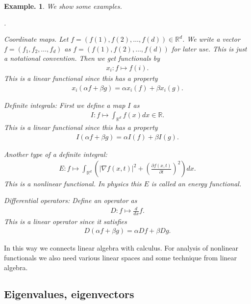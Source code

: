 \documentclass[openany, a4paper, oneside]{book}
\newcounter{enum2}
\renewenvironment{enumerate}{%
\begin{list}%
{%
\arabic{enum2}.\ \,%
}%
{%
\usecounter{enum2}
\setlength{\itemindent}{0pt}%
\setlength{\leftmargin}{6pt}%
\setlength{\rightmargin}{0pt}%
\setlength{\labelsep}{0pt}%
\setlength{\labelwidth}{6pt}%
\setlength{\itemsep}{0pt}%
\setlength{\parsep}{0pt}%
\setlength{\listparindent}{0pt}%
}
}{%
\end{list}%
}
\theoremstyle{break}
\theoremstyle{breakdefn}
\newtheorem{ex}[thm]{Example.}
\newcommand{\abs}[1]{\left|#1\right|}
\newcommand{\rbk}[1]{\left (#1\right)}
\newcommand{\bbR}{\mathbb{R}}
\begin{document}
\begin{ex}
 We show some examples.
\begin{enumerate}
\item Coordinate maps. Let $f = (f(1), f(2), \dots, f(d)) \in \bbR^d$.
    We write a vector $f = (f_1, f_2, \dots, f_d)$ as $f = (f(1), f(2), \dots, f(d))$ for later use.
    This is just a notational convention.
    Then we get functionals by
   \begin{align}
    x_i \colon f \mapsto f(i).
   \end{align}
    This is a linear functional since this has a property
   \begin{align}
    x_i \rbk{\alpha f + \beta g}
    =
    \alpha x_i \rbk{f} + \beta x_i \rbk{g}.
   \end{align}
\item Definite integrals: First we define a map $I$ as
   \begin{align}
     I \colon
     f \mapsto \int_{\bbR^d} f(x) dx \in \bbR.
   \end{align}
    This is a linear functional since this has a property
   \begin{align}
    I \rbk{\alpha f + \beta g}
    =
    \alpha I \rbk{f} + \beta I \rbk{g}.
   \end{align}
\item Another type of a definite integral:
   \begin{align}
    E \colon
    f \mapsto \int_{\bbR^d} \rbk{\abs{\nabla f(x, t)}^2 + \rbk{\frac{\partial f(x, t)}{\partial t}}^2} dx. \label{linear-algebra-and-calculus-4}
   \end{align}
   This is a nonlinear functional.
   In physics this $E$ is called an energy functional.
\item Differential operators: Define an operator as
   \begin{align}
    D \colon f \mapsto \frac{d}{dx} f.
   \end{align}
    This is a \textup{linear operator} since it satisfies
   \begin{align}
    D \rbk{\alpha f + \beta g}
    =
    \alpha Df + \beta Dg.
   \end{align}
\end{enumerate}
\end{ex}
In this way we connects linear algebra with calculus.
For analysis of nonlinear functionals we also need various linear spaces and
some technique from linear algebra.
\subsection{Eigenvalues, eigenvectors}
\label{sec-4-1-2-7}
\end{document}
